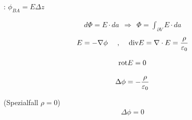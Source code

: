 \vspace{1\baselineskip}

: $\phi_{BA} = E \Delta z$

\vspace{1\baselineskip}

\begin{align*}
    d \Phi = E \cdot da \ \ \Longrightarrow \ \ \Phi = \int_{\partial V} E \cdot da
\end{align*}
\begin{align*}
    E = - \nabla \phi
    \quad \text{  ,  } \quad
    \text{div} E = \nabla \cdot E = \frac{\rho}{\varepsilon_0}
\end{align*}

\vspace{1\baselineskip}

\begin{align*}
    \text{rot} E = 0
\end{align*}

\vspace{1\baselineskip}

\begin{align*}
    \Delta \phi = - \frac{\rho}{\varepsilon_0}
\end{align*}

\vspace{1\baselineskip}

(Spezialfall $\rho = 0$)
\begin{align*}
    \Delta \phi = 0
\end{align*}

\pagebreak



